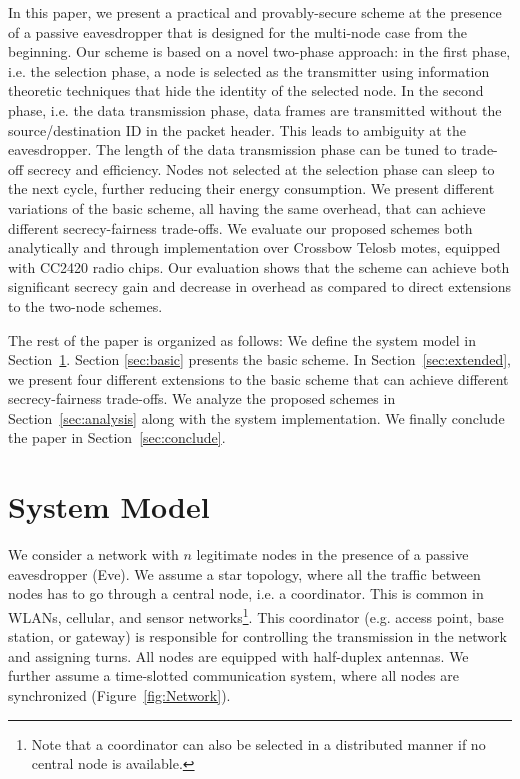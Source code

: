 \documentclass[10pt,letterpaper,conference]{IEEEtran}
\begin{document}
In this paper, we present a practical and provably-secure scheme at the presence
of a passive eavesdropper that is designed for the multi-node case from the
beginning. Our scheme is based on a novel two-phase approach: in the first
phase, i.e. the selection phase, a node is selected as the transmitter using
information theoretic techniques that hide the identity of the selected node. In
the second phase, i.e. the data transmission phase, data frames are transmitted
without the source/destination ID in the packet header. This leads to ambiguity at the
eavesdropper. The length of the data transmission phase can be tuned to trade-off
secrecy and efficiency. Nodes not selected at the selection phase can sleep to
the next cycle, further reducing their energy consumption. We present different
variations of the basic scheme, all having the same overhead, that can achieve
different secrecy-fairness trade-offs.  We evaluate our proposed schemes both
analytically and through implementation over Crossbow Telosb motes, equipped
with CC2420 radio chips. Our evaluation shows that the scheme can achieve
both significant secrecy gain and decrease in overhead as compared to direct extensions to the two-node schemes.

The rest of the paper is organized as follows: We define the system model in
Section~\ref{sec:model}. Section \ref{sec:basic} presents the basic scheme. In
Section~\ref{sec:extended}, we present four different extensions to the basic
scheme that can achieve different secrecy-fairness trade-offs. We analyze the
proposed schemes in Section~\ref{sec:analysis} along with the system implementation. We finally
conclude the paper in
Section~\ref{sec:conclude}.

\section{System Model}
\label{sec:model}

We consider a network with $n$ legitimate nodes in the presence of a passive
eavesdropper (Eve). We assume a star topology, where all the traffic between nodes has
to go through a central node, i.e. a coordinator. This is common in WLANs,
cellular, and sensor networks\footnote{Note that a coordinator can also be
selected in a distributed manner if no central node is available.}. This
coordinator (e.g. access point, base station, or gateway) is responsible for
controlling the transmission in the network and assigning turns. All nodes are
equipped with half-duplex antennas. We further assume a time-slotted
communication system, where all nodes are synchronized
(Figure~\ref{fig:Network}).
\end{document}
